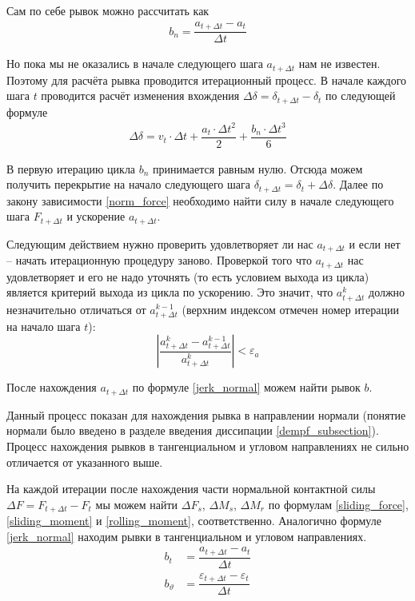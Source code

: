 \documentclass[utf8x, 14pt, oneside, a4paper]{article}
\begin{document}
Сам по себе рывок можно рассчитать как
\begin{align}
\label{jerk_normal}
b_n = \dfrac{a_{t + \Delta t} - a_{t}}{\Delta t}
\end{align}

Но пока мы не оказались в начале следующего шага $a_{t + \Delta t}$ нам не известен.
Поэтому для расчёта рывка проводится итерационный процесс. 
В начале каждого шага $t$ проводится расчёт изменения вхождения $\Delta \delta = \delta_{t + \Delta t} - \delta_t$ по следующей формуле
\begin{align}
\Delta \delta = v_t \cdot \Delta t + \dfrac{a_t \cdot \Delta t^2}{2} +  \dfrac{b_n \cdot \Delta t^3}{6}
\end{align}

В первую итерацию цикла $b_n$ принимается равным нулю.
Отсюда можем получить перекрытие на начало следующего шага $\delta_{t + \Delta t} = \delta_t + \Delta \delta$.
Далее по закону зависимости \ref{norm_force} необходимо найти силу в начале следующего шага $F_{t + \Delta t}$ и ускорение $a_{t + \Delta t}$.

Следующим действием нужно проверить удовлетворяет ли нас $a_{t + \Delta t}$ и если нет -- начать итерационную процедуру заново.
Проверкой того что $a_{t + \Delta t}$ нас удовлетворяет и его не надо уточнять (то есть условием выхода из цикла) является критерий выхода из цикла по ускорению.
Это значит, что $a_{t + \Delta t}^k$ должно незначительно отличаться от  $a_{t + \Delta t}^{k-1}$ (верхним индексом отмечен номер итерации на начало шага $t$):
\begin{equation}
\label{jerk_condition}
\left| \dfrac{a_{t + \Delta t}^k - a_{t + \Delta t}^{k-1}}{a_{t + \Delta t}^k} \right| < \varepsilon_a
\end{equation}

После нахождения $a_{t + \Delta t}$ по формуле \ref{jerk_normal} можем найти рывок $b$.

Данный процесс показан для нахождения рывка в направлении нормали (понятие нормали было введено в разделе введения  диссипации \ref{dempf_subsection}). 
Процесс нахождения рывков в тангенциальном и угловом направлениях не сильно отличается от указанного выше.

На каждой итерации после нахождения части нормальной контактной силы $\Delta F = F_{t+\Delta t} - F_t$  мы можем найти $\Delta F_s$, $\Delta M_s$, $\Delta M_r$ по формулам \ref{sliding_force}, \ref{sliding_moment} и \ref{rolling_moment}, соответственно.
Аналогично формуле \ref{jerk_normal} находим рывки в тангенциальном и угловом направлениях.
\begin{align}
b_t &= \dfrac{a_{t + \Delta t} - a_{t}}{\Delta t} \label{jerk_tangent}\\
b_{\vartheta} &= \dfrac{\varepsilon_{t + \Delta t} - \varepsilon_{t}}{\Delta t} \label{jerk_angular}
\end{align}
\end{document}
